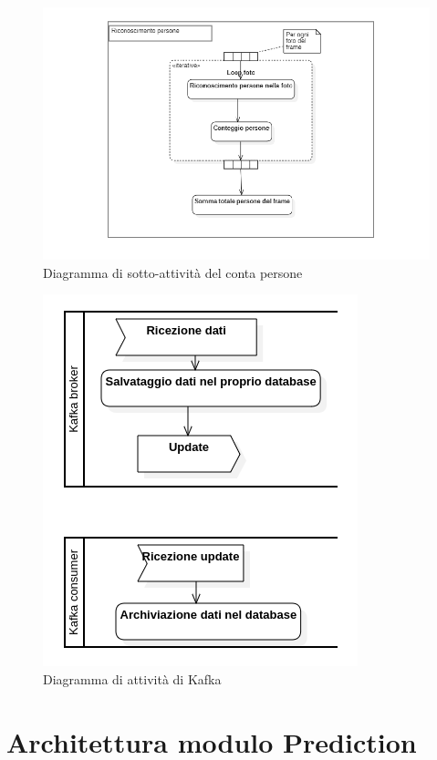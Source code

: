 \begin{figure}[H]
  \begin{center}
    \includegraphics[scale=0.7]{../immagini/diag_PB/conta_persone.png}
    \caption{Diagramma di sotto-attività del conta persone}
  \end{center}
\end{figure}
\begin{figure}[H]
  \begin{center}
    \includegraphics[scale=0.8]{../immagini/diag_PB/kafka.png}
    \caption{Diagramma di attività di Kafka}
  \end{center}
\end{figure}


\section{Architettura modulo Prediction}\label{ArchitetturaDelProdottoArchitetturaModuloPrediction}
